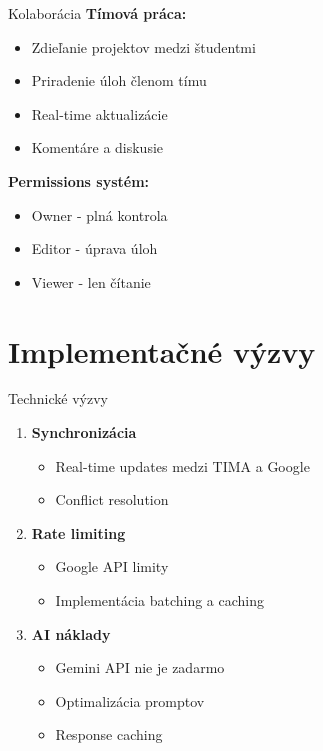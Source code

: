 \documentclass{beamer}
\begin{document}
\begin{frame}{Kolaborácia}
\textbf{Tímová práca:}
\begin{itemize}
\item Zdieľanie projektov medzi študentmi
\item Priradenie úloh členom tímu
\item Real-time aktualizácie
\item Komentáre a diskusie
\end{itemize}

\vspace{0.5cm}
\textbf{Permissions systém:}
\begin{itemize}
\item Owner - plná kontrola
\item Editor - úprava úloh
\item Viewer - len čítanie
\end{itemize}
\end{frame}

\section{Implementačné výzvy}

\begin{frame}{Technické výzvy}
\begin{enumerate}
\item \textbf{Synchronizácia}
  \begin{itemize}
  \item Real-time updates medzi TIMA a Google
  \item Conflict resolution
  \end{itemize}
\item \textbf{Rate limiting}
  \begin{itemize}
  \item Google API limity
  \item Implementácia batching a caching
  \end{itemize}
\item \textbf{AI náklady}
  \begin{itemize}
  \item Gemini API nie je zadarmo
  \item Optimalizácia promptov
  \item Response caching
  \end{itemize}
\end{enumerate}
\end{frame}
\end{document}
